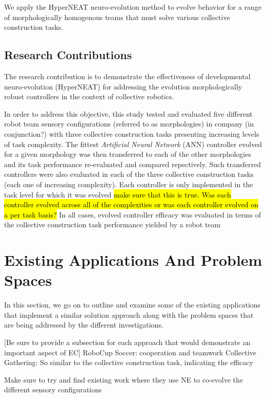 We apply the HyperNEAT \cite{StanleyDAmbrosioGauci2009} neuro-evolution method to evolve
behavior for a range of morphologically homogenous teams that must solve various collective construction tasks.

\subsection{Research Contributions}

The research contribution is to demonstrate the effectiveness of developmental neuro-evolution (HyperNEAT) for addressing the evolution morphologically robust controllers in the context of collective robotics.

In order to address this objective, this study tested and evaluated five different robot team sensory configurations (referred to as morphologies) in company (in conjunction?) with three collective construction tasks presenting increasing levels of task complexity. The fittest \textit{Artificial Neural Network} (ANN) controller evolved for a given morphology was then transferred to each of the other morphologies and its task performance re-evaluated and compared repectively. Such transferred controllers were also evaluated in each of the three collective construction tasks (each one of increasing complexity). Each controller is only implemented in the task level for which it was evolved \hl{make sure that this is true. Was each controller evolved across all of the complexities or was each controller evolved on a per task basis?}
In all cases, evolved controller efficacy was evaluated in terms of the collective construction task performance yielded by a robot team


\section{Existing Applications And Problem Spaces}

In this section, we go on to outline and examine some of the existing applications that implement a similar solution approach along with the problem spaces that are being addressed by the different investigations.

[Be sure to provide a subsection for each approach that would demonstrate an important aspect of EC]
RoboCup Soccer: cooperation and teamwork
Collective Gathering: So similar to the collective construction task, indicating the efficacy

Make sure to try and find existing work where they use NE to co-evolve the different sensory configurations


